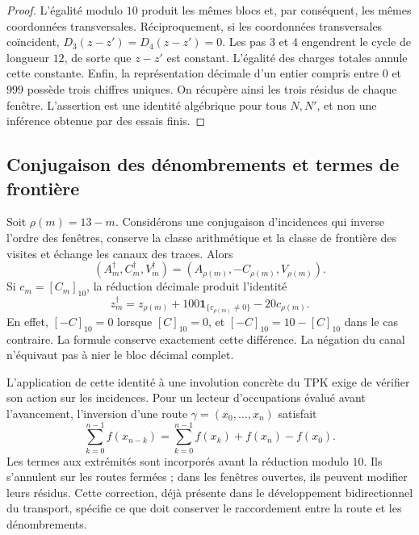 \begin{proof}
L'égalité modulo \(10\) produit les mêmes blocs et, par conséquent,
les mêmes coordonnées transversales. Réciproquement, si les coordonnées
transversales coïncident, \(D_3(z-z')=D_4(z-z')=0\). Les pas
\(3\) et \(4\) engendrent le cycle de longueur \(12\), de sorte que
\(z-z'\) est constant. L'égalité des charges totales annule cette
constante. Enfin, la représentation décimale d'un entier compris entre
\(0\) et \(999\) possède trois chiffres uniques. On récupère ainsi les
trois résidus de chaque fenêtre. L'assertion est une identité algébrique
pour tous \(N,N'\), et non une inférence obtenue par des essais finis.
\end{proof}

\subsection{Conjugaison des dénombrements et termes de frontière}
\label{x_reciprocidad:subsec:registro-conjugacion-incidencial}

Soit \(\rho(m)=13-m\). Considérons une conjugaison d'incidences
qui inverse l'ordre des fenêtres, conserve la classe arithmétique et la
classe de frontière des visites et échange les canaux des traces.
Alors
\[
 (A_m^\dagger,C_m^\dagger,V_m^\dagger)
 =(A_{\rho(m)},-C_{\rho(m)},V_{\rho(m)}).
\]
Si \(c_m=[C_m]_{10}\), la réduction décimale produit l'identité
\begin{equation}
 z_m^\dagger=z_{\rho(m)}
       +100\mathbf1_{\{c_{\rho(m)}\ne0\}}-20c_{\rho(m)}.
 \label{x_reciprocidad:eq:registro-conjugacion-decimal}
\end{equation}
En effet, \([-C]_{10}=0\) lorsque \([C]_{10}=0\), et
\([-C]_{10}=10-[C]_{10}\) dans le cas contraire. La formule conserve
exactement cette différence. La négation du canal n'équivaut pas à nier
le bloc décimal complet.

L'application de cette identité à une involution concrète du TPK exige
de vérifier son action sur les incidences. Pour un lecteur d'occupations
évalué avant l'avancement, l'inversion d'une route
\(\gamma=(x_0,\ldots,x_n)\) satisfait
\[
 \sum_{k=0}^{n-1}f(x_{n-k})
 =\sum_{k=0}^{n-1}f(x_k)+f(x_n)-f(x_0).
\]
Les termes aux extrémités sont incorporés avant la réduction modulo
\(10\). Ils s'annulent sur les routes fermées ; dans les fenêtres ouvertes, ils peuvent
modifier leurs résidus. Cette correction, déjà présente dans le développement
bidirectionnel du transport, spécifie ce que doit conserver le raccordement
entre la route et les dénombrements.


